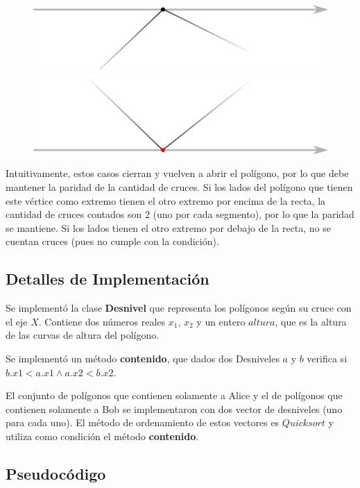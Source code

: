 \begin{itemize}
\begin{figure}[H]
\centering
\label{w_4y5}
\includegraphics[scale=0.8]{./figuras/w_4.png}
\includegraphics[scale=0.8]{./figuras/w_5.png}
\end{figure}

Intuitivamente, estos casos cierran y vuelven a abrir el polígono, por lo que debe mantener la paridad de
la cantidad de cruces. Si los lados del polígono que tienen este vértice como extremo tienen el otro extremo
por encima de la recta, la cantidad de cruces contados son 2 (uno por cada segmento), por lo que la paridad se
mantiene. Si los lados tienen el otro extremo por debajo de la recta, no se cuentan cruces (pues no cumple con
la condición).
\end{itemize}

\subsection*{Detalles de Implementación}

Se implementó la clase \textbf{Desnivel} que representa los polígonos según su cruce con el eje $X$.
Contiene dos números reales $x_1$, $x_2$ y un entero $altura$, que es la altura de las curvas de altura
del polígono.

Se implementó un método \textbf{contenido}, que dados dos Desniveles $a$ y $b$ verifica si
$b.x1 < a.x1 \wedge a.x2 < b.x2$.

El conjunto de polígonos que contienen solamente a Alice y el de polígonos que contienen solamente a Bob
se implementaron con dos vector de desniveles (uno para cada uno). El método de ordenamiento de estos
vectores es $Quicksort$ y utiliza como condición el método \textbf{contenido}.

\subsection*{Pseudocódigo}

